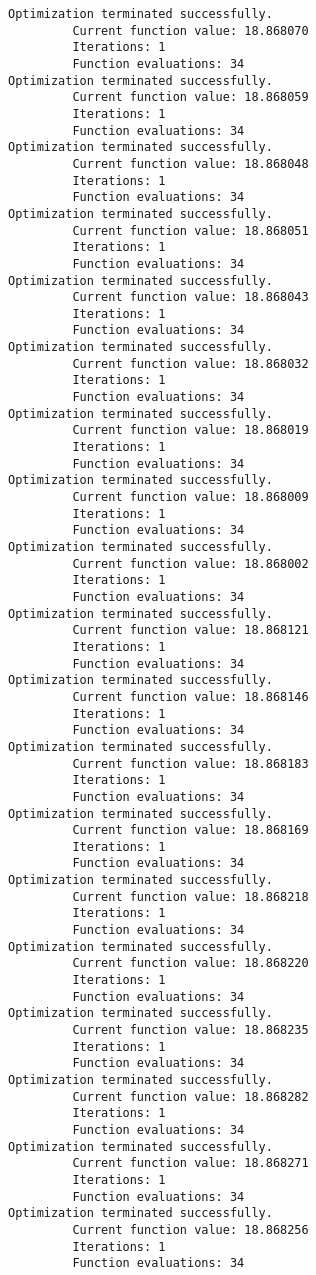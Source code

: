 \documentclass[11pt]{article}
\begin{document}
\begin{Verbatim}[commandchars=\\\{\}]
Optimization terminated successfully.
         Current function value: 18.868070
         Iterations: 1
         Function evaluations: 34
Optimization terminated successfully.
         Current function value: 18.868059
         Iterations: 1
         Function evaluations: 34
Optimization terminated successfully.
         Current function value: 18.868048
         Iterations: 1
         Function evaluations: 34
Optimization terminated successfully.
         Current function value: 18.868051
         Iterations: 1
         Function evaluations: 34
Optimization terminated successfully.
         Current function value: 18.868043
         Iterations: 1
         Function evaluations: 34
Optimization terminated successfully.
         Current function value: 18.868032
         Iterations: 1
         Function evaluations: 34
Optimization terminated successfully.
         Current function value: 18.868019
         Iterations: 1
         Function evaluations: 34
Optimization terminated successfully.
         Current function value: 18.868009
         Iterations: 1
         Function evaluations: 34
Optimization terminated successfully.
         Current function value: 18.868002
         Iterations: 1
         Function evaluations: 34
Optimization terminated successfully.
         Current function value: 18.868121
         Iterations: 1
         Function evaluations: 34
Optimization terminated successfully.
         Current function value: 18.868146
         Iterations: 1
         Function evaluations: 34
Optimization terminated successfully.
         Current function value: 18.868183
         Iterations: 1
         Function evaluations: 34
Optimization terminated successfully.
         Current function value: 18.868169
         Iterations: 1
         Function evaluations: 34
Optimization terminated successfully.
         Current function value: 18.868218
         Iterations: 1
         Function evaluations: 34
Optimization terminated successfully.
         Current function value: 18.868220
         Iterations: 1
         Function evaluations: 34
Optimization terminated successfully.
         Current function value: 18.868235
         Iterations: 1
         Function evaluations: 34
Optimization terminated successfully.
         Current function value: 18.868282
         Iterations: 1
         Function evaluations: 34
Optimization terminated successfully.
         Current function value: 18.868271
         Iterations: 1
         Function evaluations: 34
Optimization terminated successfully.
         Current function value: 18.868256
         Iterations: 1
         Function evaluations: 34

\end{Verbatim}
\end{document}
